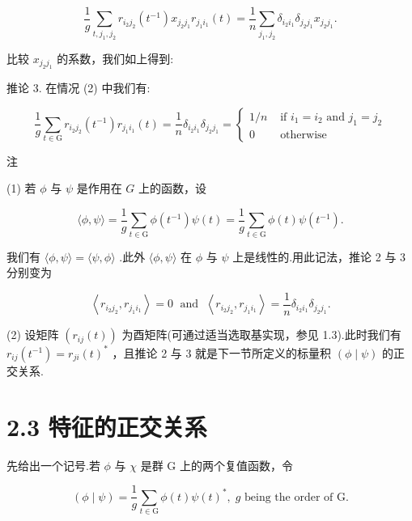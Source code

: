 \[
\frac{1}{g}\mathop{\sum }\limits_{{t,{j}_{1},{j}_{2}}}{r}_{{i}_{2}{j}_{2}}\left( {t}^{-1}\right) {x}_{{j}_{2}{j}_{1}}{r}_{{j}_{1}{i}_{1}}\left( t\right)  = \frac{1}{n}\mathop{\sum }\limits_{{{j}_{1},{j}_{2}}}{\delta }_{{i}_{2}{i}_{1}}{\delta }_{{j}_{2}{j}_{1}}{x}_{{j}_{2}{j}_{1}}.
\]

比较 \({x}_{{j}_{2}{j}_{1}}\) 的系数，我们如上得到:

推论 3. 在情况 (2) 中我们有:

\[
\frac{1}{g}\mathop{\sum }\limits_{{t \in  \mathrm{G}}}{r}_{{i}_{2}{j}_{2}}\left( {t}^{-1}\right) {r}_{{j}_{1}{i}_{1}}\left( t\right)  = \frac{1}{n}{\delta }_{{i}_{2}{i}_{1}}{\delta }_{{j}_{2}{j}_{1}} = \left\{  \begin{array}{ll} 1/n & \text{ if }{i}_{1} = {i}_{2}\text{ and }{j}_{1} = {j}_{2} \\  0 & \text{ otherwise } \end{array}\right.
\]

注

(1) 若 \(\phi\) 与 \(\psi\) 是作用在 \(G\) 上的函数，设

\[
\langle \phi ,\psi \rangle  = \frac{1}{g}\mathop{\sum }\limits_{{t \in  \mathrm{G}}}\phi \left( {t}^{-1}\right) \psi \left( t\right)  = \frac{1}{g}\mathop{\sum }\limits_{{t \in  \mathrm{G}}}\phi \left( t\right) \psi \left( {t}^{-1}\right) .
\]

我们有 \(\langle \phi ,\psi \rangle  = \langle \psi ,\phi \rangle\) .此外 \(\langle \phi ,\psi \rangle\) 在 \(\phi\) 与 \(\psi\) 上是线性的.用此记法，推论 2 与 3 分别变为

\[
\left\langle  {{r}_{{i}_{2}{j}_{2}},{r}_{{j}_{1}{i}_{1}}}\right\rangle   = 0\;\text{ and }\;\left\langle  {{r}_{{i}_{2}{j}_{2}},{r}_{{j}_{1}{i}_{1}}}\right\rangle   = \frac{1}{n}{\delta }_{{i}_{2}{i}_{1}}{\delta }_{{j}_{2}{j}_{1}}.
\]

(2) 设矩阵 \(\left( {{r}_{ij}\left( t\right) }\right)\) 为酉矩阵(可通过适当选取基实现，参见 1.3).此时我们有 \({r}_{ij}\left( {t}^{-1}\right)  = {r}_{ji}{\left( t\right) }^{ * }\) ，且推论 2 与 3 就是下一节所定义的标量积 \(\left( {\phi  \mid  \psi }\right)\) 的正交关系.

\section*{2.3 特征的正交关系}

先给出一个记号.若 \(\phi\) 与 \(\chi\) 是群 G 上的两个复值函数，令

\[
\left( {\phi  \mid  \psi }\right)  = \frac{1}{g}\mathop{\sum }\limits_{{t \in  \mathrm{G}}}\phi \left( t\right) \psi {\left( t\right) }^{ * },\;g\text{ being the order of }\mathrm{G}.
\]

